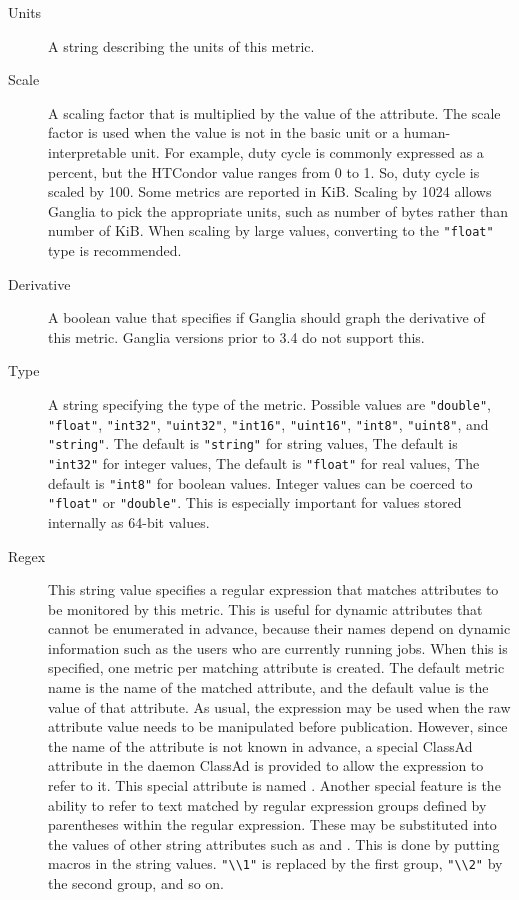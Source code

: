 \begin{description}
  \item[Units] A string describing the units of this metric.

  \item[Scale] A scaling factor that is multiplied by the value of the
     attribute.
    The scale factor is used when the value is not in the basic unit
    or a human-interpretable unit. For example, duty cycle is commonly
    expressed as a percent, but the HTCondor value ranges from 0 to 1.
    So, duty cycle is scaled by 100. Some metrics are reported in KiB.
    Scaling by 1024 allows Ganglia to pick the appropriate units,
    such as number of bytes rather than number of KiB. 
    When scaling by large values, converting to
    the \verb|"float"| type is recommended.

  \item[Derivative] A boolean value that specifies if Ganglia should
    graph the derivative of this metric.  Ganglia versions prior to
    3.4 do not support this.

  \item[Type] A string specifying the type of the metric.  Possible
    values are \verb|"double"|, \verb|"float"|, \verb|"int32"|,
    \verb|"uint32"|, \verb|"int16"|, \verb|"uint16"|,
    \verb|"int8"|, \verb|"uint8"|, and \verb|"string"|.
    The default is \verb|"string"| for string values,
    The default is \verb|"int32"| for integer values,
    The default is \verb|"float"| for real values,
    The default is \verb|"int8"| for boolean values.
    Integer values can be coerced to \verb|"float"| or \verb|"double"|.
    This is especially important for values stored internally as 64-bit
    values.

  \item[Regex] This string value specifies a regular expression that
    matches attributes to be monitored by this metric.  This is useful
    for dynamic attributes that cannot be enumerated in advance,
    because their names depend on dynamic information such as the
    users who are currently running jobs.  When this is specified, one
    metric per matching attribute is created.  The default metric name
    is the name of the matched attribute, and the default value is the
    value of that attribute.  As usual, the  expression
    may be used when the raw attribute value needs to be manipulated
    before publication.  However, since the name of the attribute is
    not known in advance, a special ClassAd attribute in the daemon ClassAd
    is provided to allow the  expression to refer to it.
    This special attribute is named .  Another special
    feature is the ability to refer to text matched by regular
    expression groups defined by parentheses within the regular
    expression.  These may be substituted into the values of other
    string attributes such as  and .  This is
    done by putting macros in the string values.  \verb|"\\1"| is
    replaced by the first group, \verb|"\\2"| by the second group, and
    so on.


\end{description}

